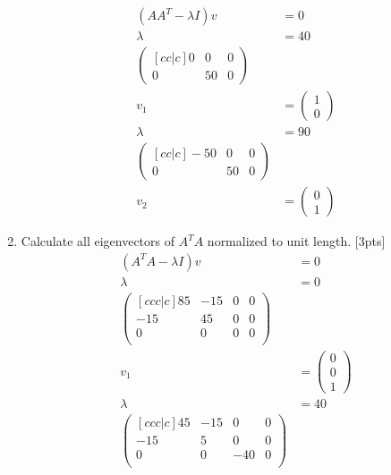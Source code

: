 \documentclass{article}
\begin{document}
\begin{enumerate}[label=(\alph*)]
\begin{align*}
    (AA^T-\lambda I)v &= 0 \\
    \lambda  &= 40 \\
    \begin{pmatrix}[cc|c]
        0 & 0  & 0\\
        0 & 50 & 0
    \end{pmatrix} \\
    v_1 &= \begin{pmatrix}
        1 \\ 0
    \end{pmatrix} \\
    \lambda  &= 90 \\
    \begin{pmatrix}[cc|c]
        -50 & 0  & 0\\
        0 & 50 & 0
    \end{pmatrix} \\
    v_2 &= \begin{pmatrix}
        0 \\ 1
    \end{pmatrix}
\end{align*}
\item Calculate all eigenvectors of $A^{T}A$ normalized to unit length.  [3pts] \newline \begin{align*}
    (A^TA-\lambda I)v &= 0 \\
    \lambda  &= 0 \\
    \begin{pmatrix}[ccc|c]
        85  & -15  &   0  & 0\\
        -15  &  45   &  0 & 0 \\
        0   &  0  &   0  & 0 \\
    \end{pmatrix} \\
    v_1 &= \begin{pmatrix}
        0 \\ 0 \\ 1
    \end{pmatrix} \\
    \lambda  &= 40 \\
    \begin{pmatrix}[ccc|c]
        45  & -15  &   0  & 0\\
        -15  &  5   &  0 & 0 \\
        0   &  0  &   -40  & 0 \\
    \end{pmatrix} \\

\end{align*}
\end{enumerate}
\end{document}
